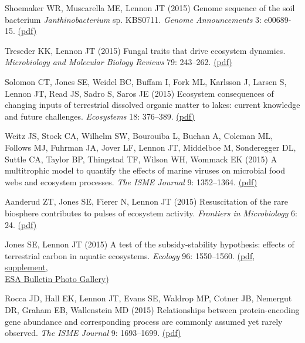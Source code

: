 \documentclass[11pt]{article}
\begin{document}
\begin{etaremune}
\item Shoemaker WR, Muscarella ME, Lennon JT (2015) Genome sequence of the soil bacterium \textit{Janthinobacterium} sp. KBS0711. \textit{Genome Announcements} 3: e00689-15. \href{https://lennonlab.github.io/assets/publications/Shoemaker_etal_2015.pdf}{(pdf)}

\item Treseder KK, Lennon JT (2015) Fungal traits that drive ecosystem dynamics. \textit{Microbiology and Molecular Biology Reviews} 79: 243–262. \href{https://lennonlab.github.io/assets/publications/Treseder_Lennon_2015.pdf}{(pdf)}

\item Solomon CT, Jones SE, Weidel BC, Buffam I, Fork ML, Karlsson J, Larsen S, Lennon JT, Read JS, Sadro S, Saros JE (2015) Ecosystem consequences of changing inputs of terrestrial dissolved organic matter to lakes: current knowledge and future challenges. \textit{Ecosystems} 18: 376–389. \href{https://lennonlab.github.io/assets/publications/Solomon_etal_2015.pdf}{(pdf)}

\item Weitz JS, Stock CA, Wilhelm SW, Bourouiba L, Buchan A, Coleman ML, Follows MJ, Fuhrman JA, Jover LF, Lennon JT, Middelboe M, Sonderegger DL, Suttle CA, Taylor BP, Thingstad TF, Wilson WH, Wommack EK (2015) A multitrophic model to quantify the effects of marine viruses on microbial food webs and ecosystem processes. \textit{The ISME Journal} 9: 1352–1364. \href{https://lennonlab.github.io/assets/publications/Weitz_etal_2015.pdf}{(pdf)}

\item Aanderud ZT, Jones SE, Fierer N, Lennon JT (2015) Resuscitation of the rare biosphere contributes to pulses of ecosystem activity. \textit{Frontiers in Microbiology} 6: 24. \href{https://lennonlab.github.io/assets/publications/Aanderud_etal_2015.pdf}{(pdf)}

\item Jones SE, Lennon JT (2015) A test of the subsidy-stability hypothesis: effects of terrestrial carbon in aquatic ecosystems. \textit{Ecology} 96: 1550–1560. \href{https://lennonlab.github.io/assets/publications/Jones_Lennon_2015.pdf}{(pdf}, \href{https://esapubs.org/archive/ecol/E096/138/}{supplement}, \\ \href{https://lennonlab.github.io/assets/publications/Jones_Lennon_2016_ESABulletin.pdf}{ESA Bulletin Photo Gallery)}

\item Rocca JD, Hall EK, Lennon JT, Evans SE, Waldrop MP, Cotner JB, Nemergut DR, Graham EB, Wallenstein MD (2015) Relationships between protein-encoding gene abundance and corresponding process are commonly assumed yet rarely observed. \textit{The ISME Journal} 9: 1693–1699. \href{https://lennonlab.github.io/assets/publications/Rocca_etal_2015.pdf}{(pdf)}


\end{etaremune}
\end{document}
